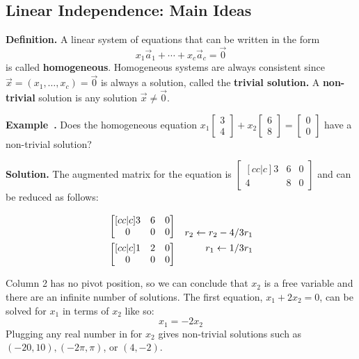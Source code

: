 \documentclass[11pt, letterpaper]{report}
\newenvironment{notes}{}{}
\newenvironment{book}{}{}
\newcounter{example}[section]
\newcommand{\example}{\refstepcounter{example}%
\par\noindent\textbf{Example~\theexample.} }
\newenvironment{definition}{\begin{bbox}\par\noindent\textbf{Definition. }}
  {\end{bbox}}
\newlength\oldfboxsep%
\newlength\myminiwidth%
\newenvironment{bbox}{%
  \setlength\oldfboxsep\fboxsep
  \setlength{\fboxsep}{.1in}%
  \setlength\myminiwidth\linewidth%
  \addtolength\myminiwidth{-0.2in}%
  \vspace{0.1in}%
  \begin{lrbox}{\bboxbox}\begin{minipage}{\myminiwidth}%
    }{%
    \end{minipage}\end{lrbox}%
  \noindent\fbox{\usebox{\bboxbox}}\vspace{0.1in}\setlength\fboxsep\oldfboxsep%
}
\newcommand{\bbvec}[2]{
  \begin{bmatrix} #1 \\ #2 \end{bmatrix}
}
\begin{document}
\begin{notes}
\newpage
\end{notes}

\subsection{Linear Independence: Main Ideas}\label{subsec:linear-independence-main-ideas}

\begin{definition}  
A linear system of equations that can be written in the form 
\[ x_1 \vec{a}_1 + \cdots + x_c\vec{a}_c = \vec{0}\]
is called \textbf{homogeneous}. Homogeneous systems are always consistent since $\vec{x} = ( x_1, \ldots, x_c )=\vec{0}$ is always a solution, called the \textbf{trivial solution.} A \textbf{non-trivial} solution is any solution $\vec{x} \ne \vec{0}$. 
\end{definition}

\example \label{example:1.4first-homog} Does the homogeneous equation $x_1 \bbvec{3}{4} + x_2 \bbvec{6}{8} = \bbvec{0}{0}$ have a non-trivial solution?

\begin{notes}
\vfill
\end{notes}

\begin{book}
\textbf{Solution.} The augmented matrix for the equation is $\begin{bmatrix}[cc|c]
3 & 6 & 0 \\
4 & 8 & 0
\end{bmatrix}$ and can be reduced as follows:

\begin{align*}
&\begin{bmatrix}[cc|c]
3 & 6 & 0 \\
0 & 0 & 0 
\end{bmatrix} &\begin{matrix}
\rule{0em}{1em} \\ r_2 \leftarrow r_2 - 4/3r_1 
\end{matrix} \\
&\begin{bmatrix}[cc|c]
1 & 2 & 0 \\
0 & 0 & 0 
\end{bmatrix} &\begin{matrix}
r_1 \leftarrow 1/3r_1 \\ \rule{0em}{0.8pt}
\end{matrix}
\end{align*}

Column 2 has no pivot position, so we can conclude that $x_2$ is a free variable and there are an infinite number of solutions. The first equation, $x_1+2x_2 = 0$, can be solved for $x_1$ in terms of $x_2$ like so:
\[x_1=-2x_2\]
Plugging any real number in for $x_2$ gives non-trivial solutions such as $(-20,10), (-2\pi, \pi)$, or $(4,-2)$. \blacksquare
\end{book}
\end{document}

